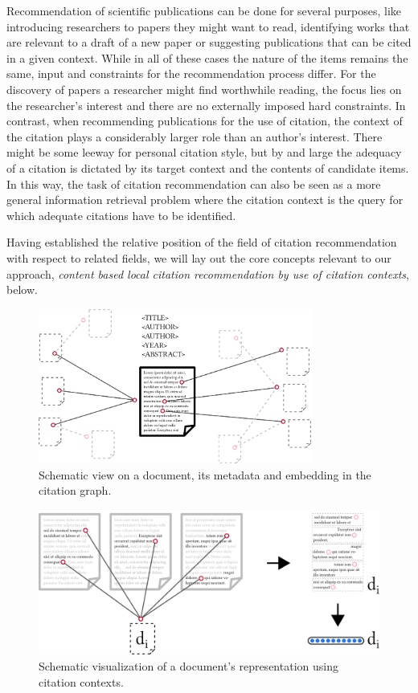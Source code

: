 Recommendation of scientific publications can be done for several purposes, like introducing researchers to papers they might want to read, identifying works that are relevant to a draft of a new paper or suggesting publications that can be cited in a given context. While in all of these cases the nature of the items remains the same, input and constraints for the recommendation process differ. For the discovery of papers a researcher might find worthwhile reading, the focus lies on the researcher's interest and there are no externally imposed hard constraints. In contrast, when recommending publications for the use of citation, the context of the citation plays a considerably larger role than an author's interest. There might be some leeway for personal citation style, but by and large the adequacy of a citation is dictated by its target context and the contents of candidate items. In this way, the task of citation recommendation can also be seen as a more general information retrieval problem where the citation context is the query for which adequate citations have to be identified.

Having established the relative position of the field of citation recommendation with respect to related fields, we will lay out the core concepts relevant to our approach, \emph{content based local citation recommendation by use of citation contexts}, below.

\begin{figure}
  \centering
    \includegraphics[width=0.8\textwidth]{figures/background/document_rich_view.pdf}
  \caption{Schematic view on a document, its metadata and embedding in the citation graph.}
  \label{fig:docrichview}
\end{figure}

\begin{figure}[t]
  \centering
    \includegraphics[width=\textwidth]{figures/background/document_context_view_withvec.pdf}
  \caption{Schematic visualization of a document's representation using citation contexts.}
  \label{fig:doccontview}
\end{figure}

